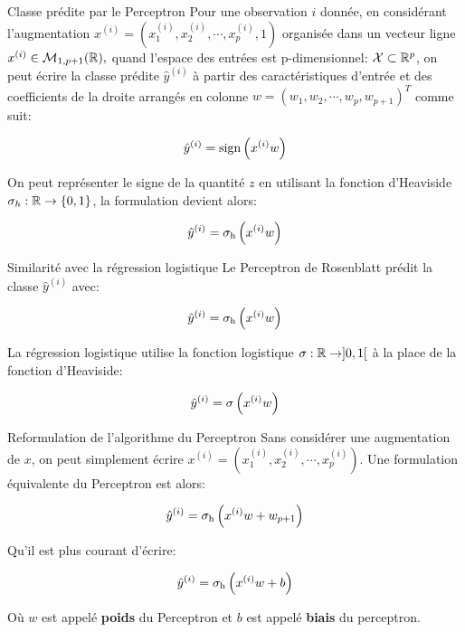 \begin{frame}{Classe prédite par le Perceptron}
	Pour une observation $i$ donnée, en considérant l'augmentation $x^{(i)} = (x_1^{(i)}, x_2^{(i)}, \cdots, x_p^{(i)}, 1)$ organisée dans un vecteur ligne $x^{(i)} \in \mathcal{M}_{1,p+1}(\mathbb{R}),$  quand l'espace des entrées est p-dimensionnel: $\mathcal{X} \subset \mathbb{R}^p$, on peut écrire la classe prédite $\hat{y}^{(i)}$ à partir des caractéristiques d'entrée et des coefficients de la droite arrangés en colonne $w = (w_1, w_2, \cdots, w_p, w_{p+1})^T$ comme suit:
	
	\begin{equation*}
		\hat{y}^{(i)} = \operatorname{sign}\left(x^{(i)} w\right)
	\end{equation*}
	
	\pause
	On peut représenter le signe de la quantité $z$ en utilisant la fonction d'Heaviside $\sigma_h: \mathbb{R} \to \{0, 1\}$, la formulation devient alors:
	
	\begin{equation*}
		\hat{y}^{(i)} = \operatorname{\sigma_h}\left(x^{(i)} w\right)
	\end{equation*}
	
\end{frame}

\begin{frame}{Similarité avec la régression logistique}
	Le Perceptron de Rosenblatt prédit la classe $\hat{y}^{(i)}$ avec:
	
	\begin{equation*}
		\hat{y}^{(i)} = \operatorname{\sigma_h}\left(x^{(i)} w\right)
	\end{equation*}
	
	La régression logistique utilise la fonction logistique $\sigma: \mathbb{R} \to ]0, 1[$ à la place de la fonction d'Heaviside:
	
	\begin{equation*}
		\hat{y}^{(i)} = \operatorname{\sigma}\left(x^{(i)} w\right)
	\end{equation*}
\end{frame}


\begin{frame}{Reformulation de l'algorithme du Perceptron}
	Sans considérer une augmentation de $x$, on peut simplement écrire $x^{(i)} = (x_1^{(i)}, x_2^{(i)}, \cdots, x_p^{(i)})$. Une formulation équivalente du Perceptron est alors:
	
	\begin{equation*}
		\hat{y}^{(i)} = \operatorname{\sigma_h}\left(x^{(i)} w + w_{p+1}\right)
	\end{equation*}
	
	Qu'il est plus courant d'écrire:
	
	\begin{equation*}
		\hat{y}^{(i)} = \operatorname{\sigma_h}\left(x^{(i)} w + b\right)
	\end{equation*}
	
	Où $w$ est appelé \textbf{poids} du Perceptron et $b$ est appelé \textbf{biais} du perceptron.
	
	
	
\end{frame}

